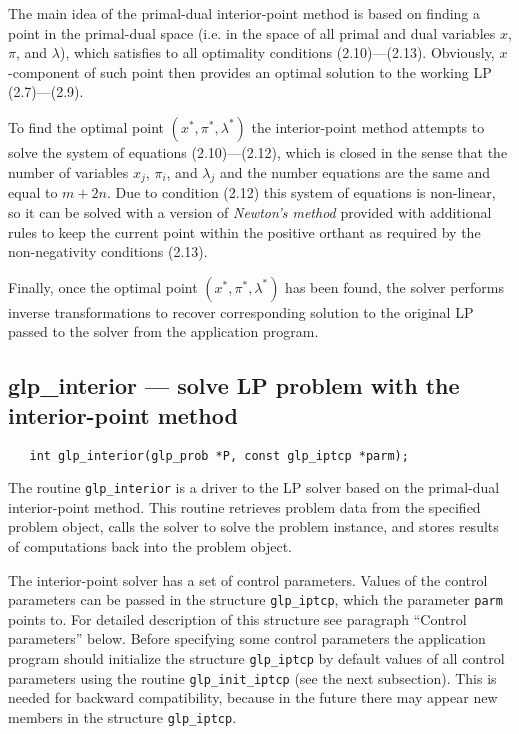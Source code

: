 The main idea of the primal-dual interior-point method is based on
finding a point in the primal-dual space (i.e. in the space of all
primal and dual variables $x$, $\pi$, and $\lambda$), which satisfies
to all optimality conditions (2.10)---(2.13). Obviously, $x$-component
of such point then provides an optimal solution to the working LP
(2.7)---(2.9).

To find the optimal point $(x^*,\pi^*,\lambda^*)$ the interior-point
method attempts to solve the system of equations (2.10)---(2.12), which
is closed in the sense that the number of variables $x_j$, $\pi_i$, and
$\lambda_j$ and the number equations are the same and equal to $m+2n$.
Due to condition (2.12) this system of equations is non-linear, so it
can be solved with a version of {\it Newton's method} provided with
additional rules to keep the current point within the positive orthant
as required by the non-negativity conditions (2.13).

Finally, once the optimal point $(x^*,\pi^*,\lambda^*)$ has been found,
the solver performs inverse transformations to recover corresponding
solution to the original LP passed to the solver from the application
program.

\subsection{glp\_interior --- solve LP problem with the interior-point
method}

\synopsis

\begin{verbatim}
   int glp_interior(glp_prob *P, const glp_iptcp *parm);
\end{verbatim}

\description

The routine \verb|glp_interior| is a driver to the LP solver based on
the primal-dual interior-point method. This routine retrieves problem
data from the specified problem object, calls the solver to solve the
problem instance, and stores results of computations back into the
problem object.

The interior-point solver has a set of control parameters. Values of
the control parameters can be passed in the structure \verb|glp_iptcp|,
which the parameter \verb|parm| points to. For detailed description of
this structure see paragraph ``Control parameters'' below. Before
specifying some control parameters the application program should
initialize the structure \verb|glp_iptcp| by default values of all
control parameters using the routine \verb|glp_init_iptcp| (see the
next subsection). This is needed for backward compatibility, because in
the future there may appear new members in the structure
\verb|glp_iptcp|.

